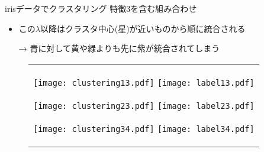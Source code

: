 \documentclass[dvipdfmx, 10pt]{beamer}
\newcommand{\zl}{\rightarrow}
\begin{document}

\begin{frame}[noframenumbering]{irisデータでクラスタリング}
    特徴3を含む組み合わせ
    \begin{itemize}
        \item この$\lambda$以降はクラスタ中心(星)が近いものから順に統合される
        
        → 青に対して黄や緑よりも先に紫が統合されてしまう
    \end{itemize}
    \begin{figure}
        \begin{tabular}{c}
        \begin{minipage}{0.3\hsize}
            \texttt{[image: clustering13.pdf]}
            \texttt{[image: label13.pdf]}
        \end{minipage}
        \begin{minipage}{0.3\hsize}
            \texttt{[image: clustering23.pdf]}
            \texttt{[image: label23.pdf]}
        \end{minipage}
        \begin{minipage}{0.3\hsize}
            \texttt{[image: clustering34.pdf]}
            \texttt{[image: label34.pdf]}
        \end{minipage}
        \end{tabular}
    \end{figure}

\end{frame}



\end{document}
